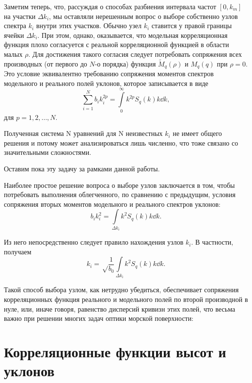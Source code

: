 Заметим теперь, что, рассуждая о способах разбиения интервала частот $[0, k_m]$ на участки $\Delta k_i$, мы оставляли нерешенным вопрос о выборе собственно узлов спектра $k_i$ внутри этих участков. Обычно узел $k_i$ ставится у правой границы ячейки $\Delta k_i$. При этом, однако, оказывается, что модельная корреляционная функция плохо согласуется с реальной корреляционной функцией в области малых $\rho$. Для достижения такого согласия следует потребовать сопряжения всех производных (от первого до $N$-о порядка) функция $\tilde M_q(\rho)$ и $M_q(q)$ при $\rho=0$. Это условие эквивалентно требованию сопряжения моментов спектров модельного и реального полей уклонов, которое записывается в виде 
\begin{equation}
	\sum_{i=1}^N b_ik_i^{2p}=\int\limits_{0}^{\infty} k^{2p}S_q(k)k\dd{k},
\end{equation}
для $p=1,2,\dots,N.$

Полученная система N уравнений для N неизвестных $k_i$ не имеет общего решения и потому может анализироваться лишь численно, что тоже связано со значительными сложностями.

Оставим пока эту задачу за рамками данной работы.

Наиболее простое решение вопроса о выборе узлов заключается в том, чтобы потребовать выполнения облегченного, по сравнению с предыдущим, условия сопряжения вторых моментов модельного и реального спектров уклонов:
\begin{equation}
	b_i k_i^2=\int\limits_{\Delta k_i} k^2 S_q(k) k \dd{k}.
\end{equation}

Из него непосредственно следует правило нахождения узлов $k_i$. В частности, получаем
\begin{equation}
	k_i=\sqrt\frac{1}{b_0} \int\limits_{\Delta k_i} k^2 S_q(k) k \dd{k}.
\end{equation}

Такой способ выбора узлом, как нетрудно убедиться, обеспечивает сопряжения корреляционных функция реального и модельного полей по второй производной в нуле, или, иначе говоря, равенство дисперсий кривизн этих полей, что весьма важно при решении многих задач оптики морской поверхности:

\section{Корреляционные функции высот и уклонов}

